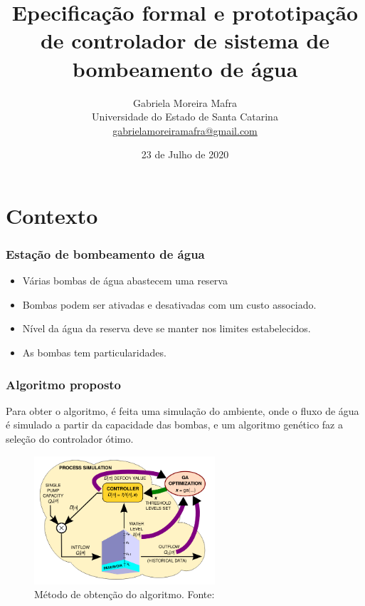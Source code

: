 \documentclass{beamer}
\title[Controlador de sistema de
  bombeamento de água]{Epecificação formal e prototipação de controlador de sistema de bombeamento de água}
\author[Gabriela M. Mafra]{
    Gabriela Moreira Mafra\\\smallskip
    {\scriptsize Universidade do Estado de Santa Catarina \\\smallskip
    \vspace{-2mm}
    \url{gabrielamoreiramafra@gmail.com}}
}
\begin{document}
  \date{23 de Julho de 2020}
  \begin{frame}
      \titlepage
  \end{frame}

  \section{Contexto}

  \begin{frame}
    \frametitle{Estação de bombeamento de água}

      \begin{itemize}
      \item Várias bombas de água abastecem uma reserva
      \item Bombas podem ser ativadas e desativadas com um custo associado.
      \item Nível da água da reserva deve se manter nos limites estabelecidos.
      \item As bombas tem particularidades.
      \end{itemize}
  \end{frame}

  \begin{frame}
    \frametitle{Algoritmo proposto}
      Para obter o algoritmo, é feita uma
simulação do ambiente, onde o fluxo de água é simulado a partir da capacidade
das bombas, e um algoritmo genético faz a seleção do controlador ótimo.

     \begin{figure}
        \includegraphics[width=0.6\textwidth]{obtencao_algoritmo.png}
        \caption{Método de obtenção do algoritmo. Fonte: \cite{pumps}}
        \label{fig:ams}
      \end{figure}

  \end{frame}
\end{document}

